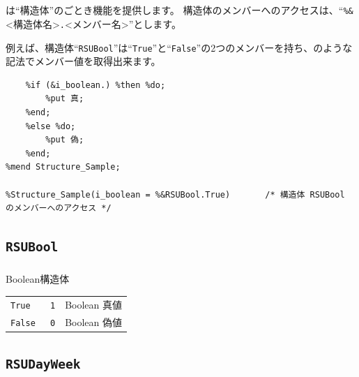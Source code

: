 \chapter{\DocStrTitleRDMPredefStructure}
\RDM は``構造体''のごとき機能を提供します。
構造体のメンバーへのアクセスは、``\texttt{\%\&}<構造体名>\texttt{.}<メンバー名>''とします。
 
例えば、構造体``\texttt{RSUBool}''は``\texttt{True}''と``\texttt{False}''の2つのメンバーを持ち、のような記法でメンバー値を取得出来ます。
\begin{lstlisting}[language=SAS, caption={構造体の使用例}, label={code:structure_example}, breaklines = true]
%macro Structure_Sample(i_boolean =);
	%if (&i_boolean.) %then %do;
		%put 真;
	%end;
	%else %do;
		%put 偽;
	%end;
%mend Structure_Sample;
 
%Structure_Sample(i_boolean = %&RSUBool.True)		/* 構造体 RSUBool のメンバーへのアクセス */
\end{lstlisting}
\section{\texttt{RSUBool}}
\paragraph{\DocStrDescription}Boolean構造体
\begin{center}
{\footnotesize
\begin{xltabular}{\textwidth}{|p{5truecm}|p{2truecm}|X|}
\hline
\thead{\DocStrHeaderStructMemberName}&\thead{\DocStrHeaderStructMemberValue}&\thead{\DocStrDescription}\\
\hline
\hline
\texttt{True}&\texttt{	1}&Boolean 真値\\
\hline
\texttt{False}&\texttt{	0}&Boolean 偽値\\
\hline
\end{xltabular}
}
\end{center}
\section{\texttt{RSUDayWeek}}
